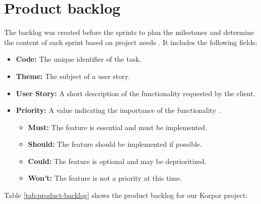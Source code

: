 \section{Product backlog}

The backlog was created before the sprints to plan the milestones and determine the content of each sprint based on project needs \cite{ProductBacklogGuide2024, SchwarzScrum2019}. It includes the following fields:
\begin{itemize}
    \item \textbf{Code:} The unique identifier of the task.
    \item \textbf{Theme:} The subject of a user story.
    \item \textbf{User Story:} A short description of the functionality requested by the client.
    \item \textbf{Priority:} A value indicating the importance of the functionality \cite{MoscowMethodology2021, CleggCaseMethod2004}.
    \begin{itemize}
        \item \textbf{Must:} The feature is essential and must be implemented.
        \item \textbf{Should:} The feature should be implemented if possible.
        \item \textbf{Could:} The feature is optional and may be deprioritized.
        \item \textbf{Won't:} The feature is not a priority at this time.
    \end{itemize}
\end{itemize}

Table \ref{tab:product-backlog} shows the product backlog for our Korpor project:


